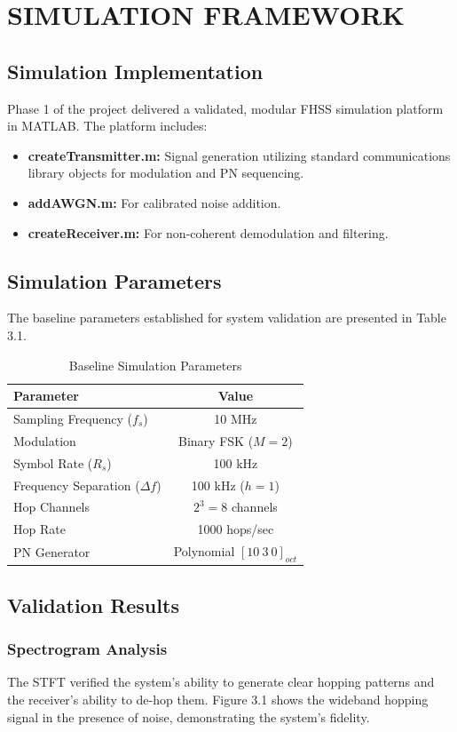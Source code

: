 \documentclass[12pt,a4paper]{report}
\theoremstyle{plain}
\begin{document}
\chapter{SIMULATION FRAMEWORK}
\section{Simulation Implementation}
Phase 1 of the project delivered a validated, modular FHSS simulation platform in MATLAB. The platform includes:
\begin{itemize}
    \item \textbf{createTransmitter.m:} Signal generation utilizing standard communications library objects for modulation and PN sequencing.
    \item \textbf{addAWGN.m:} For calibrated noise addition.
    \item \textbf{createReceiver.m:} For non-coherent demodulation and filtering.
\end{itemize}

\section{Simulation Parameters}
The baseline parameters established for system validation are presented in Table 3.1.

\begin{table}[H]
\centering
\caption{Baseline Simulation Parameters}
\begin{tabular}{lc}
\toprule
\textbf{Parameter} & \textbf{Value} \\
\midrule
Sampling Frequency ($f_s$) & 10 MHz \\
Modulation & Binary FSK ($M=2$) \\
Symbol Rate ($R_s$) & 100 kHz \\
Frequency Separation ($\Delta f$) & 100 kHz ($h=1$) \\
Hop Channels & $2^3 = 8$ channels \\
Hop Rate & 1000 hops/sec \\
PN Generator & Polynomial $[10~3~0]_{oct}$ \\
\bottomrule
\end{tabular}
\end{table}

\section{Validation Results}
\subsection{Spectrogram Analysis}
The STFT verified the system's ability to generate clear hopping patterns and the receiver's ability to de-hop them. Figure 3.1 shows the wideband hopping signal in the presence of noise, demonstrating the system's fidelity.
\end{document}
